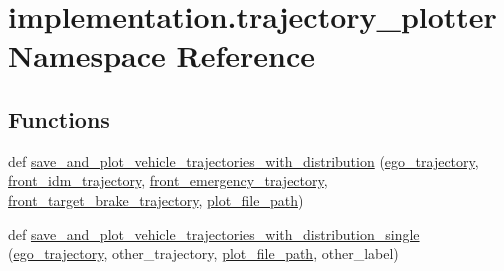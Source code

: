 \hypertarget{namespaceimplementation_1_1trajectory__plotter}{}\section{implementation.\+trajectory\+\_\+plotter Namespace Reference}
\label{namespaceimplementation_1_1trajectory__plotter}
\subsection*{Functions}
\begin{DoxyCompactItemize}
\item 
def \hyperlink{namespaceimplementation_1_1trajectory__plotter_adc1e6b6db2bdd8b4db610b52ca28d6f2}{save\+\_\+and\+\_\+plot\+\_\+vehicle\+\_\+trajectories\+\_\+with\+\_\+distribution} (\hyperlink{namespaceimplementation_1_1trajectory__plotter_a67f2155d9cf9a5d23184e9a8331fa9c5}{ego\+\_\+trajectory}, \hyperlink{namespaceimplementation_1_1trajectory__plotter_a4c22c7f433a5039d636903ed5f4e1108}{front\+\_\+idm\+\_\+trajectory}, \hyperlink{namespaceimplementation_1_1trajectory__plotter_a846371d252b7c5855d1ff6fb0e40ba5f}{front\+\_\+emergency\+\_\+trajectory}, \hyperlink{namespaceimplementation_1_1trajectory__plotter_af6991a76275b979eba7ce26234f998ad}{front\+\_\+target\+\_\+brake\+\_\+trajectory}, \hyperlink{namespaceimplementation_1_1trajectory__plotter_ab7f05b6b273366f3532e78b97de5069e}{plot\+\_\+file\+\_\+path})
\item 
def \hyperlink{namespaceimplementation_1_1trajectory__plotter_afda6f1690dcedd6c66ce6952bf783c8b}{save\+\_\+and\+\_\+plot\+\_\+vehicle\+\_\+trajectories\+\_\+with\+\_\+distribution\+\_\+single} (\hyperlink{namespaceimplementation_1_1trajectory__plotter_a67f2155d9cf9a5d23184e9a8331fa9c5}{ego\+\_\+trajectory}, other\+\_\+trajectory, \hyperlink{namespaceimplementation_1_1trajectory__plotter_ab7f05b6b273366f3532e78b97de5069e}{plot\+\_\+file\+\_\+path}, other\+\_\+label)
\end{DoxyCompactItemize}
